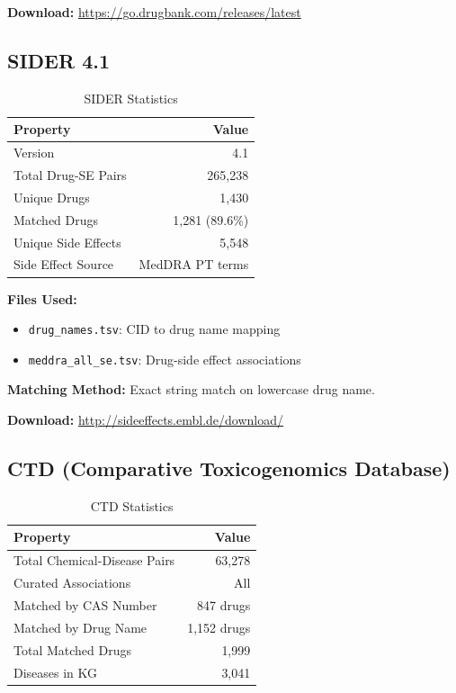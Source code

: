 \documentclass[11pt,a4paper]{article}
\begin{document}
\textbf{Download:} \url{https://go.drugbank.com/releases/latest}

\subsection{SIDER 4.1}
\label{sec:sider}

\begin{table}[h]
\centering
\caption{SIDER Statistics}
\begin{tabular}{@{}lr@{}}
\toprule
\textbf{Property} & \textbf{Value} \\
\midrule
Version & 4.1 \\
Total Drug-SE Pairs & 265,238 \\
Unique Drugs & 1,430 \\
Matched Drugs & 1,281 (89.6\%) \\
Unique Side Effects & 5,548 \\
Side Effect Source & MedDRA PT terms \\
\bottomrule
\end{tabular}
\end{table}

\textbf{Files Used:}
\begin{itemize}
    \item \texttt{drug\_names.tsv}: CID to drug name mapping
    \item \texttt{meddra\_all\_se.tsv}: Drug-side effect associations
\end{itemize}

\textbf{Matching Method:} Exact string match on lowercase drug name.

\textbf{Download:} \url{http://sideeffects.embl.de/download/}

\subsection{CTD (Comparative Toxicogenomics Database)}
\label{sec:ctd}

\begin{table}[h]
\centering
\caption{CTD Statistics}
\begin{tabular}{@{}lr@{}}
\toprule
\textbf{Property} & \textbf{Value} \\
\midrule
Total Chemical-Disease Pairs & 63,278 \\
Curated Associations & All \\
Matched by CAS Number & 847 drugs \\
Matched by Drug Name & 1,152 drugs \\
Total Matched Drugs & 1,999 \\
Diseases in KG & 3,041 \\
\bottomrule
\end{tabular}
\end{table}
\end{document}
